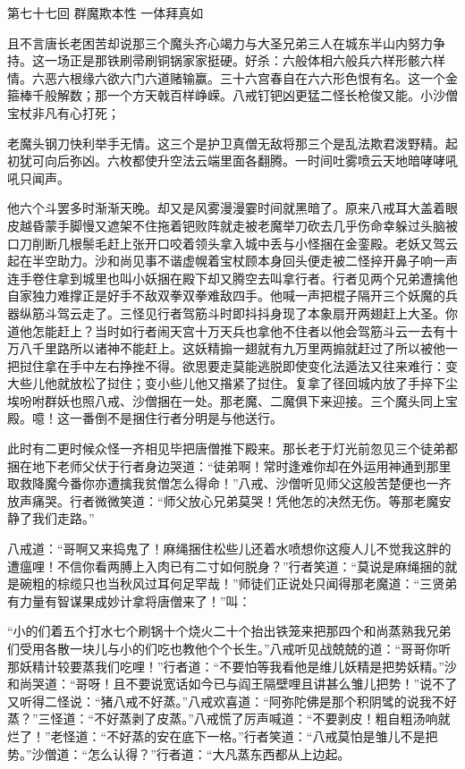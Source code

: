 \documentclass[12pt,UTF8]{ctexbook}
\begin{document}
{	第七十七回 群魔欺本性 一体拜真如
	
	且不言唐长老困苦却说那三个魔头齐心竭力与大圣兄弟三人在城东半山内努力争持。这一场正是那铁刷帚刷铜锅家家挺硬。好杀：六般体相六般兵六样形骸六样情。六恶六根缘六欲六门六道赌输赢。三十六宫春自在六六形色恨有名。这一个金箍棒千般解数；那一个方天戟百样峥嵘。八戒钉钯凶更猛二怪长枪俊又能。小沙僧宝杖非凡有心打死；
	
	老魔头钢刀快利举手无情。这三个是护卫真僧无敌将那三个是乱法欺君泼野精。起初犹可向后弥凶。六枚都使升空法云端里面各翻腾。一时间吐雾喷云天地暗哮哮吼吼只闻声。
	
	他六个斗罢多时渐渐天晚。却又是风雾漫漫霎时间就黑暗了。原来八戒耳大盖着眼皮越昏蒙手脚慢又遮架不住拖着钯败阵就走被老魔举刀砍去几乎伤命幸躲过头脑被口刀削断几根鬃毛赶上张开口咬着领头拿入城中丢与小怪捆在金銮殿。老妖又驾云起在半空助力。沙和尚见事不谐虚幌着宝杖顾本身回头便走被二怪捽开鼻子响一声连手卷住拿到城里也叫小妖捆在殿下却又腾空去叫拿行者。行者见两个兄弟遭擒他自家独力难撑正是好手不敌双拳双拳难敌四手。他喊一声把棍子隔开三个妖魔的兵器纵筋斗驾云走了。三怪见行者驾筋斗时即抖抖身现了本象扇开两翅赶上大圣。你道他怎能赶上？当时如行者闹天宫十万天兵也拿他不住者以他会驾筋斗云一去有十万八千里路所以诸神不能赶上。这妖精搧一翅就有九万里两搧就赶过了所以被他一把挝住拿在手中左右挣挫不得。欲思要走莫能逃脱即使变化法遁法又往来难行：变大些儿他就放松了挝住；变小些儿他又揝紧了挝住。复拿了径回城内放了手捽下尘埃吩咐群妖也照八戒、沙僧捆在一处。那老魔、二魔俱下来迎接。三个魔头同上宝殿。噫！这一番倒不是捆住行者分明是与他送行。
	
	此时有二更时候众怪一齐相见毕把唐僧推下殿来。那长老于灯光前忽见三个徒弟都捆在地下老师父伏于行者身边哭道：“徒弟啊！常时逢难你却在外运用神通到那里取救降魔今番你亦遭擒我贫僧怎么得命！”八戒、沙僧听见师父这般苦楚便也一齐放声痛哭。行者微微笑道：“师父放心兄弟莫哭！凭他怎的决然无伤。等那老魔安静了我们走路。”
	
	八戒道：“哥啊又来捣鬼了！麻绳捆住松些儿还着水喷想你这瘦人儿不觉我这胖的遭瘟哩！不信你看两膊上入肉已有二寸如何脱身？”行者笑道：“莫说是麻绳捆的就是碗粗的棕缆只也当秋风过耳何足罕哉！”师徒们正说处只闻得那老魔道：“三贤弟有力量有智谋果成妙计拿将唐僧来了！”叫：
	
	“小的们着五个打水七个刷锅十个烧火二十个抬出铁笼来把那四个和尚蒸熟我兄弟们受用各散一块儿与小的们吃也教他个个长生。”八戒听见战兢兢的道：“哥哥你听那妖精计较要蒸我们吃哩！”行者道：“不要怕等我看他是维儿妖精是把势妖精。”沙和尚哭道：“哥呀！且不要说宽话如今已与阎王隔壁哩且讲甚么雏儿把势！”说不了又听得二怪说：“猪八戒不好蒸。”八戒欢喜道：“阿弥陀佛是那个积阴骘的说我不好蒸？”三怪道：“不好蒸剥了皮蒸。”八戒慌了厉声喊道：“不要剥皮！粗自粗汤响就烂了！”老怪道：“不好蒸的安在底下一格。”行者笑道：“八戒莫怕是雏儿不是把势。”沙僧道：“怎么认得？”行者道：“大凡蒸东西都从上边起。
	
}
\end{document}
